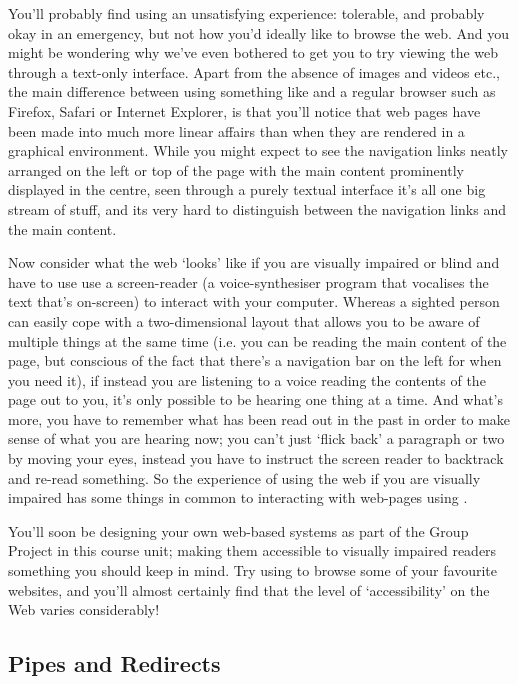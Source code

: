 You'll probably find using  an unsatisfying experience: tolerable, and probably okay in an emergency, but not how you'd ideally like to browse the web. And you might be wondering why we've even bothered to get you to try viewing the web through a text-only interface. Apart from the absence of images and videos etc., the main difference between using something like  and a regular browser such as Firefox, Safari or Internet Explorer, is that you'll notice that web pages have been made into much more linear affairs than when they are rendered in a graphical environment. While you might expect to see the navigation links neatly arranged on the left or top of the page with the main content prominently displayed in the centre, seen through a purely textual interface it's all one big stream of stuff, and its very hard to distinguish between the navigation links and the main content. 

Now consider what the web `looks' like if you are visually impaired or blind and have to use use a screen-reader (a voice-synthesiser program that vocalises the text that's on-screen) to interact with your computer. Whereas a sighted person can easily cope with a two-dimensional layout that allows you to be aware of multiple things at the same time (i.e. you can be reading the main content of the page, but conscious of the fact that there's a navigation bar on the left for when you need it), if instead you are listening to a voice reading the contents of the page out to you, it's only possible to be hearing one thing at a time. And what's more, you have to remember what has been read out in the past in order to make sense of what you are hearing now; you can't just `flick back' a paragraph or two by moving your eyes, instead you have to instruct the screen reader to backtrack and re-read something. So the experience of using the web if you are visually impaired has some things in common to interacting with web-pages using . 

You'll soon be designing your own web-based systems as part of the Group Project in this course unit; making them accessible to visually impaired readers something you should keep in mind. Try using  to browse some of your favourite websites, and you'll almost certainly find that the level of `accessibility' on the Web varies considerably!

\subsection{Pipes and Redirects}

